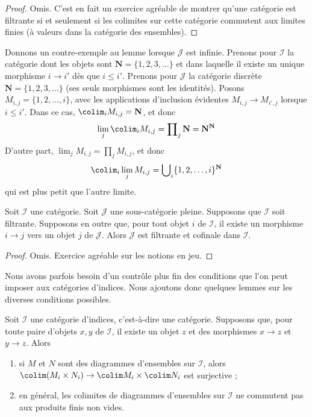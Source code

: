 \begin{proof}
Omis. C'est en fait un exercice agréable de montrer qu'une catégorie est
filtrante si et seulement si les colimites sur cette catégorie commutent
aux limites finies (à valeurs dans la catégorie des ensembles).
\end{proof}

\noindent
Donnons un contre-exemple au lemme lorsque $\mathcal{J}$ est infinie.
Prenons pour $\mathcal{I}$ la catégorie dont les objets sont
$\mathbf{N} = \{1, 2, 3, \ldots\}$ et dans laquelle il existe un unique
morphisme $i \to i'$ dès que $i \leq i'$.
Prenons pour $\mathcal{J}$ la catégorie discrète
$\mathbf{N} = \{1, 2, 3, \ldots\}$ (ses seuls morphismes sont les identités).
Posons $M_{i, j} = \{1, 2, \ldots, i\}$, avec les applications d'inclusion
évidentes $M_{i, j} \to M_{i', j}$ lorsque $i \leq i'$. Dans ce cas,
$\colim_i M_{i, j} = \mathbf{N}$, et donc
$$
\lim_j \colim_i M_{i, j}
=
\prod\nolimits_j \mathbf{N}
=
\mathbf{N}^\mathbf{N}
$$
D'autre part, $\lim_j M_{i, j} = \prod\nolimits_j M_{i, j}$, et donc
$$
\colim_i \lim_j M_{i, j}
=
\bigcup\nolimits_i \{1, 2, \ldots, i\}^{\mathbf{N}}
$$
qui est plus petit que l'autre limite.

\begin{lemma}
\label{lemma-cofinal-in-filtered}
\begin{reference}
\cite[Proposition 3.2.4]{KS}
\end{reference}
Soit $\mathcal{I}$ une catégorie. Soit $\mathcal{J}$ une sous-catégorie
pleine. Supposons que $\mathcal{I}$ soit filtrante. Supposons en outre que,
pour tout objet $i$ de $\mathcal{I}$, il existe un morphisme $i \to j$
vers un objet $j$ de $\mathcal{J}$. Alors $\mathcal{J}$
est filtrante et cofinale dans $\mathcal{I}$.
\end{lemma}

\begin{proof}
Omis. Exercice agréable sur les notions en jeu.
\end{proof}

\noindent
Nous avons parfois besoin d'un contrôle plus fin des
conditions que l'on peut imposer aux catégories d'indices. Nous ajoutons
donc quelques lemmes sur les diverses conditions possibles.

\begin{lemma}
\label{lemma-preserve-products}
Soit $\mathcal{I}$ une catégorie d'indices, c'est-à-dire une catégorie.
Supposons que, pour toute paire d'objets $x, y$ de $\mathcal{I}$,
il existe un objet $z$ et des morphismes $x \to z$ et $y \to z$.
Alors
\begin{enumerate}
\item si $M$ et $N$ sont des diagrammes d'ensembles sur $\mathcal{I}$,
alors $\colim (M_i \times N_i) \to \colim M_i \times \colim N_i$
est surjective ;
\item en général, les colimites de diagrammes d'ensembles sur $\mathcal{I}$
ne commutent pas aux produits finis non vides.
\end{enumerate}
\end{lemma}

